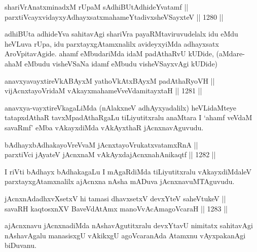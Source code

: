 \begin{shl}
shariVrAnatxminadxM rUpaM sAdhiBUtAdhideYvatamf || \\
parxtiVcayxvidayxyA\s dhayxsatxmahameYtadivxsheVSayxteV ||  1280 ||  
\end{shl}

\begin{artha}
adhiBUta adhideYva sahitavAgi shariVra payaRMtaviruvudelalx idu eMdu heVLuva rUpa, idu parxtayxgAtamxnalilx avideyxyiMda adhayxsatx AroVpitavAgide. ahamf eMbudariMda idaM padAthaRvU kUDide, (aMdare-ahaM eMbudu visheVSaNa idamf eMbudu visheVSayxvAgi kUDide)
\end{artha}


\begin{shl}
anavxyavayxtireVkABAyxM yathoVkAtxBAyxM padAthaRyoVH ||  \\
vijAcnxtayoVridaM vAkayxmahameVveVdamitayxtaH ||  1281 ||  
\end{shl}

\begin{artha}
anavxya-vayxtireVkagaLiMda (nAlakxneV adhAyxyadalilx) heVLidaMteye tatapxdAthaR tavxMpadAthaRgaLu tiLiyutitxralu anaMtara I `ahamf veVdaM savaRmf' eMba vAkayxdiMda vAkAyxthaR jAcnxnavAguvudu.
\end{artha}


\begin{shl}
bAdhayxbAdhakayoVreVvaM jAcnxtayoVrukatxvatamxRnA || \\
parxtiVci jAyateV jAcnxnaM vAkAyxdajAcnxnahAnikaqtf ||  1282 ||  
\end{shl}

\begin{artha}
I riVti bAdhayx bAdhakagaLu I mAgaRdiMda tiLiyutitxralu vAkayxdiMdaleV parxtayxgAtamxnalilx ajAcnxna nAsha mADuva jAcnxnavuMTAguvudu.
\end{artha}

\begin{shl}
jAcnxnAdadhxvXsetxV hi tamasi dhavxsetxV devxYteV saheVtukeV || \\
savaRH kaqtosxnXV BaveVdAtAmx manoVvAcAmagoVcaraH ||  1283 ||  
\end{shl}

\begin{artha}
ajAcnxnavu jAcnxnadiMda nAshavAgutitxralu devxYtavU nimitatx sahitavAgi nAshavAgalu manasisxgU vAkikxgU agoVcaranAda Atamxnu vAyxpakanAgi biDuvanu.
\end{artha}

